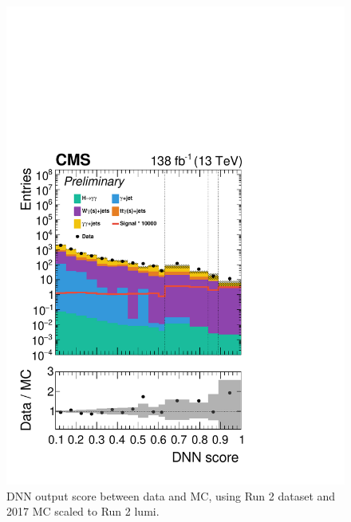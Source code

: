 \begin{figure}[H]
    \centering
    \includegraphics[width=\textwidth]{Sections/HHWWgg/images/DNN/DataMC/DataMC_evalDNN_HH_FullRegion_log.pdf}
    \caption{DNN output score between data and MC, using Run 2 dataset and 2017 MC scaled to Run 2 lumi.}
    \label{fig:SL_DNN_Score}
\end{figure}

